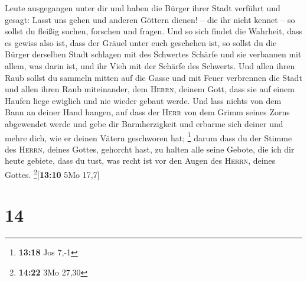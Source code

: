 Leute ausgegangen unter dir und haben die Bürger ihrer Stadt verführt
und gesagt: Lasst uns gehen und anderen Göttern dienen! -- die ihr nicht
kennet --  so sollst du fleißig suchen, forschen und
fragen. Und so sich findet die Wahrheit, dass es gewiss also ist, dass
der Gräuel unter euch geschehen ist,  so sollst du die
Bürger derselben Stadt schlagen mit des Schwertes Schärfe und sie
verbannen mit allem, was darin ist, und ihr Vieh mit der Schärfe des
Schwerts.  Und allen ihren Raub sollst du sammeln mitten
auf die Gasse und mit Feuer verbrennen die Stadt und allen ihren Raub
miteinander, dem \textsc{Herrn}, deinem Gott, dass sie auf einem Haufen
liege ewiglich und nie wieder gebaut werde.  Und lass
nichts von dem Bann an deiner Hand hangen, auf dass der \textsc{Herr}
von dem Grimm seines Zorns abgewendet werde und gebe dir Barmherzigkeit
und erbarme sich deiner und mehre dich, wie er deinen Vätern geschworen
hat; \footnote{\textbf{13:18} Jos 7,-1}  darum dass du
der Stimme des \textsc{Herrn}, deines Gottes, gehorcht hast, zu halten
alle seine Gebote, die ich dir heute gebiete, dass du tust, was recht
ist vor den Augen des \textsc{Herrn}, deines Gottes.
\footnote{\textbf{14:22} 3Mo 27,30}{[}\textbf{13:10} 5Mo 17,7{]}

\hypertarget{section-13}{%
\section{14}\label{section-13}}

